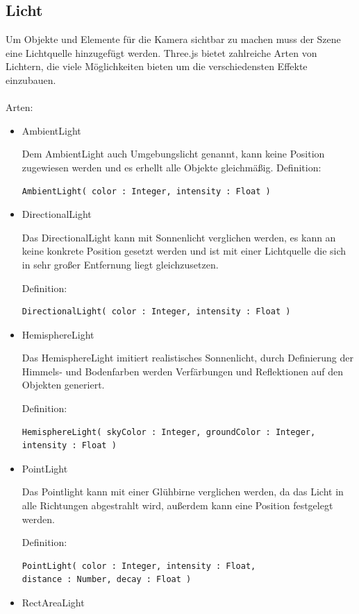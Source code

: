 \subsection*{Licht}
Um Objekte und Elemente für die Kamera sichtbar zu machen muss der Szene eine Lichtquelle hinzugefügt werden. Three.js bietet zahlreiche Arten von Lichtern, die viele Möglichkeiten bieten um die verschiedensten Effekte einzubauen.
\\
\\
Arten: 
\begin{itemize}
  \item AmbientLight 
  
Dem AmbientLight auch Umgebungslicht genannt, kann keine Position zugewiesen werden und es erhellt alle Objekte gleichmäßig.
Definition:
\begin{verbatim}
AmbientLight( color : Integer, intensity : Float )
\end{verbatim}
  \item DirectionalLight
  
Das DirectionalLight kann mit Sonnenlicht verglichen werden, es kann an keine konkrete Position gesetzt werden und ist mit einer Lichtquelle die sich in sehr großer Entfernung liegt gleichzusetzen.

Definition:
\begin{verbatim}
DirectionalLight( color : Integer, intensity : Float )
\end{verbatim}
  \item HemisphereLight
  
Das HemisphereLight imitiert realistisches Sonnenlicht, durch Definierung der Himmels- und Bodenfarben werden Verfärbungen und Reflektionen auf den Objekten generiert.

Definition:
\begin{verbatim}
HemisphereLight( skyColor : Integer, groundColor : Integer, 
intensity : Float )
\end{verbatim}
  \item PointLight
  
Das Pointlight kann mit einer Glühbirne verglichen werden, da das Licht in alle Richtungen abgestrahlt wird, außerdem kann eine Position festgelegt werden.

Definition:
\begin{verbatim}
PointLight( color : Integer, intensity : Float, 
distance : Number, decay : Float )
\end{verbatim}
  \item RectAreaLight
  

\end{itemize}
